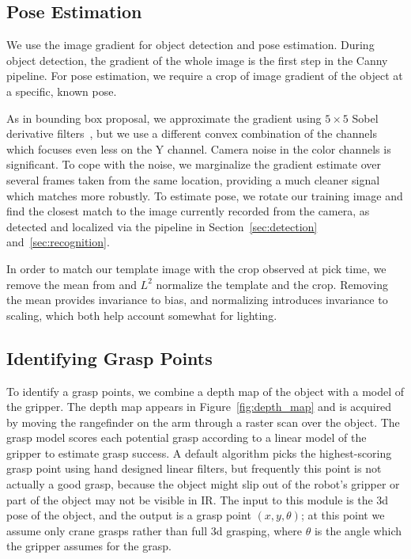 \documentclass[graybox]{svmult}
\begin{document}
 
\subsection{Pose Estimation}

We use the image gradient for object detection and pose estimation. During
object detection, the gradient of the whole image is the first step in the Canny pipeline.
For pose estimation,  we require a crop of  image gradient of the object
at a specific, known pose. 


As in bounding box proposal, we approximate the gradient using 
$5 \times 5$ Sobel derivative filters~\citep{sobel95}, but we use a
different convex combination of the channels which focuses even less
on the Y channel.  Camera noise in the color channels is significant. To
cope with the noise, we marginalize the gradient estimate over several
frames taken from the same location, providing a much cleaner signal which matches more robustly.  To estimate 
pose, we rotate our training image and find the closest match to the 
image currently recorded from the camera, as detected and localized via 
the pipeline in Section~\ref{sec:detection} and~\ref{sec:recognition}.

In order to match our template image with the crop observed at pick time,
we remove the mean from and $L^2$ normalize the template and the crop.
Removing the mean provides invariance to bias, and normalizing introduces
invariance to scaling, which both help account somewhat
for lighting. 

\subsection{Identifying Grasp Points}

To identify a grasp points, we combine a depth map of the object with
a model of the gripper.  The depth map appears in
Figure~\ref{fig:depth_map} and is acquired by moving the rangefinder
on the arm through a raster scan over the object.  The grasp model
scores each potential grasp according to a linear model of the gripper
to estimate grasp success. A default algorithm picks the
highest-scoring grasp point using hand designed linear filters, but
frequently this point is not actually a good grasp, because the object
might slip out of the robot's gripper or part of the object may not be
visible in IR.  The input to this module is the 3d pose of the object,
and the output is a grasp point $(x, y, \theta)$; at this point we
assume only crane grasps rather than full 3d grasping, where $\theta$
is the angle which the gripper assumes for the grasp.
\end{document}
